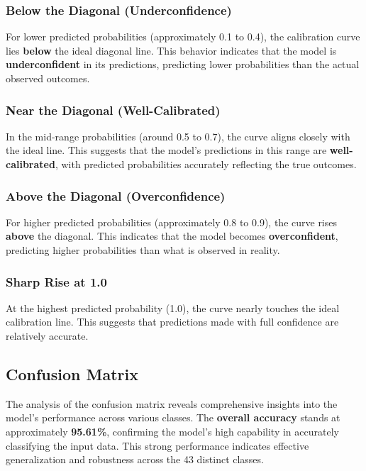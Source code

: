 \subsubsection{Below the Diagonal (Underconfidence)}
For lower predicted probabilities (approximately 0.1 to 0.4), the calibration curve lies \textbf{below} the ideal diagonal line. This behavior indicates that the model is \textbf{underconfident} in its predictions, predicting lower probabilities than the actual observed outcomes.

\subsubsection{Near the Diagonal (Well-Calibrated)}
In the mid-range probabilities (around 0.5 to 0.7), the curve aligns closely with the ideal line. This suggests that the model's predictions in this range are \textbf{well-calibrated}, with predicted probabilities accurately reflecting the true outcomes.

\subsubsection{Above the Diagonal (Overconfidence)}
For higher predicted probabilities (approximately 0.8 to 0.9), the curve rises \textbf{above} the diagonal. This indicates that the model becomes \textbf{overconfident}, predicting higher probabilities than what is observed in reality.

\subsubsection{Sharp Rise at 1.0}
At the highest predicted probability (1.0), the curve nearly touches the ideal calibration line. This suggests that predictions made with full confidence are relatively accurate.

\subsection{Confusion Matrix}

The analysis of the confusion matrix reveals comprehensive insights into the model's performance across various classes. The \textbf{overall accuracy} stands at approximately \textbf{95.61\%}, confirming the model's high capability in accurately classifying the input data. This strong performance indicates effective generalization and robustness across the 43 distinct classes.


